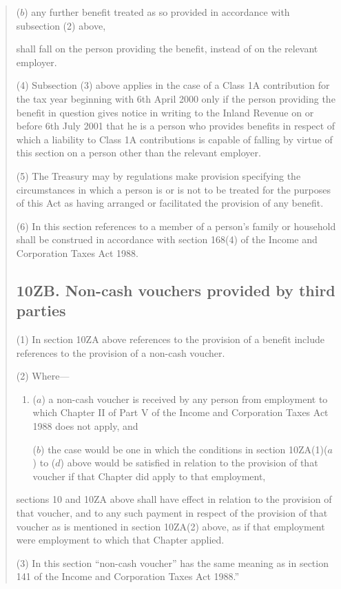 \documentclass[12pt,a4paper]{article}
\begin{document}
\begin{quotation}
\begin{enumerate}
($b$) any further benefit treated as so provided in accordance with subsection (2)  above,
\end{enumerate}
shall fall on the person providing the benefit, instead of on the relevant employer.

(4) Subsection (3)  above applies in the case of a Class 1A contribution for the tax year beginning with 6th April 2000 only if the person providing the benefit in question gives notice in writing to the Inland Revenue on or before 6th July 2001 that he is a person who provides benefits in respect of which a liability to Class 1A contributions is capable of falling by virtue of this section on a person other than the relevant employer.

(5) The Treasury may by regulations make provision specifying the circumstances in which a person is or is not to be treated for the purposes of this Act as having arranged or facilitated the provision of any benefit.

(6) In this section references to a member of a person’s family or household shall be construed in accordance with section 168(4)  of the Income and Corporation Taxes Act 1988. 

\subsection*{10ZB. Non-cash vouchers provided by third parties}

(1) In section 10ZA above references to the provision of a benefit include references to the provision of a non-cash voucher.

(2) Where—
\begin{enumerate}\item[]
($a$) a non-cash voucher is received by any person from employment to which Chapter II of Part V of the Income and Corporation Taxes Act 1988 does not apply, and

($b$) the case would be one in which the conditions in section 10ZA(1)($a$)  to ($d$)  above would be satisfied in relation to the provision of that voucher if that Chapter did apply to that employment,
\end{enumerate}
sections 10 and 10ZA above shall have effect in relation to the provision of that voucher, and to any such payment in respect of the provision of that voucher as is mentioned in section 10ZA(2)  above, as if that employment were employment to which that Chapter applied.

(3) In this section “non-cash voucher” has the same meaning as in section 141 of the Income and Corporation Taxes Act 1988.”
\end{quotation}
\end{document}
